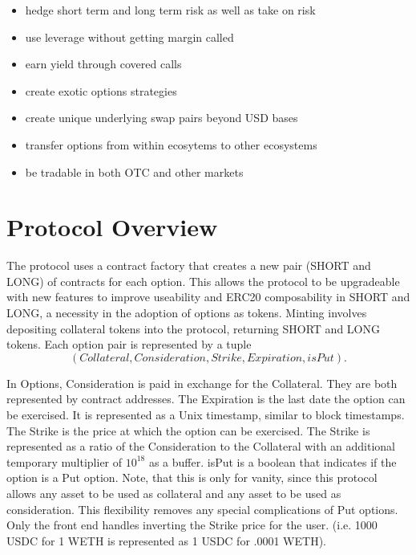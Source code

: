 \begin{itemize}
  \setlength{\itemsep}{0pt}
  \setlength{\parskip}{0pt}
  \item hedge short term and long term risk as well as take on risk
  \item use leverage without getting margin called
  \item earn yield through covered calls
  \item create exotic options strategies
  \item create unique underlying swap pairs beyond USD bases
  \item transfer options from within ecosytems to other ecosystems
  \item be tradable in both OTC and other markets
\end{itemize}

\section{\label{sec:protocol}Protocol Overview}

The \greekfi protocol uses a contract factory that creates a new pair (SHORT and LONG) of contracts for each option.
This allows the protocol to be upgradeable with new features to improve useability 
and ERC20 composability in SHORT and LONG, a necessity in the adoption of options as tokens.
Minting involves depositing collateral tokens into the protocol, returning SHORT and LONG tokens.
Each option pair is represented by a tuple 
\begin{equation*}
  (Collateral, Consideration, Strike, Expiration, isPut).
\end{equation*}

In Options, Consideration is paid in exchange for the Collateral. They are both represented by contract addresses.
The Expiration is the last date the option can be exercised. 
It is represented as a Unix timestamp, similar to block timestamps.
The Strike is the price at which the option can be exercised.
The Strike is represented as a ratio of the Consideration to the Collateral with an additional temporary multiplier of $10^{18}$ as a buffer.
isPut is a boolean that indicates if the option is a Put option. Note, that this is only for vanity, since this protocol allows any asset to be used as collateral and any asset to be used as consideration. This flexibility removes any special complications of Put options. Only the front end handles inverting the Strike price for the user. (i.e. 1000 USDC for 1 WETH is represented as 1 USDC for .0001 WETH).


